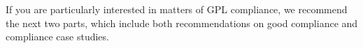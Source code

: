 
If you are particularly interested in matters of GPL compliance, we
recommend the next two parts, which include both recommendations on good
compliance and compliance case studies.



